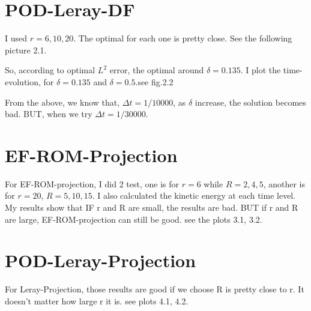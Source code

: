 \documentclass[paper=a4, fontsize=11pt]{scrartcl} %
\numberwithin{equation}{section} %
\numberwithin{figure}{section} %
\numberwithin{table}{section} %
\begin{document}
\section{POD-Leray-DF}
I used $r=6,10,20$. The optimal for each one is pretty close. See the following picture 2.1.

So, according to optimal $L^2$ error, the optimal around $\delta=0.135$. I plot the time-evolution, for $\delta=0.135$ and $\delta=0.5$.see fig.2.2
 
\clearpage
From the above, we know that, $\Delta t= 1/10000$, as $\delta$ increase, the solution becomes bad.  BUT, when we try $\Delta t= 1/30000$. 
\section{EF-ROM-Projection}
For EF-ROM-projection, I did 2 test, one is for $r=6$ while $R=2,4,5$, another is for $r=20$, $R=5,10,15$. I also calculated the kinetic energy at each time level. My results show that IF r and R are small, the results are bad. BUT if r and R are large, EF-ROM-projection can still be good. 
see the plots 3.1, 3.2.

\section{POD-Leray-Projection}
For Leray-Projection, those results are good if we choose R is pretty close to r.  It doesn't matter how large r it is. see plots 4.1, 4.2.

\end{document}
